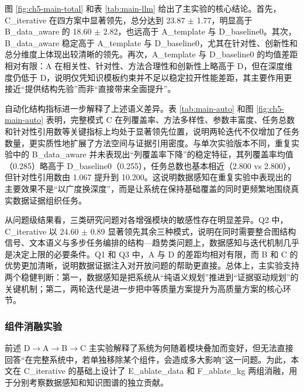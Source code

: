 图 \ref{fig:ch5-main-total} 和表 \ref{tab:main-llm} 给出了主实验的核心结论。首先，C\_iterative 在四方案中显著领先，总分达到 23.87 $\pm$ 1.77，明显高于 B\_data\_aware 的 18.60 $\pm$ 2.82，也远高于 A\_template 与 D\_baseline0。其次，B\_data\_aware 稳定高于 A\_template 与 D\_baseline0，尤其在针对性、创新性和总分维度上体现出较清晰的领先。再次，A\_template 与 D\_baseline0 的均值差距相对有限：A 在相关性、针对性、方法合理性和创新性上略高于 D，但在深度维度仍低于 D，说明仅凭知识模板约束并不足以稳定拉开性能差距，其主要作用更接近“提供结构先验”而非“直接带来全面提升”。

自动化结构指标进一步解释了上述语义差异。表 \ref{tab:main-auto} 和图 \ref{fig:ch5-main-auto} 表明，完整模式 C 在列覆盖率、方法多样性、参数丰富度、任务总数和针对性引用数等关键指标上均处于显著领先位置，说明两轮迭代不仅增加了任务数量，更实质性地扩展了方法空间与证据引用密度。与单次实验版本不同，重复实验中的 B\_data\_aware 并未表现出“列覆盖率下降”的稳定特征，其列覆盖率均值（0.285）略高于 D\_baseline0（0.255），任务总数也基本相近（2.800 vs 2.800），但针对性引用数由 1.067 提升到 10.200。这说明数据感知在重复实验中表现出的主要效果不是“以广度换深度”，而是让系统在保持基础覆盖的同时更频繁地围绕真实数据证据组织任务。

从问题级结果看，三类研究问题对各增强模块的敏感性存在明显差异。Q2 中，C\_iterative 以 24.60 $\pm$ 0.89 显著领先其余三种模式，说明在同时需要整合图结构信号、文本语义与多步任务编排的结构—趋势类问题上，数据感知与迭代机制几乎是决定上限的必要条件。Q1 和 Q3 中，A 与 D 的差距均相对有限，而 B 和 C 的优势更加清晰，说明数据证据注入对开放问题的帮助更直接。总体上，主实验支持两个稳健判断：第一，数据感知是把系统从“纯语义规划”推进到“证据驱动规划”的关键机制；第二，两轮迭代是进一步把中等质量方案提升为高质量方案的核心环节。

\subsubsection{组件消融实验}

前述 D$\rightarrow$A$\rightarrow$B$\rightarrow$C 主实验解释了系统为何随着模块叠加而变好，但无法直接回答“在完整系统中，若单独移除某个组件，会造成多大影响”这一问题。为此，本文在 C\_iterative 的基础上设计了 E\_ablate\_data 和 F\_ablate\_kg 两组消融，用于分别考察数据感知和知识图谱的独立贡献。

